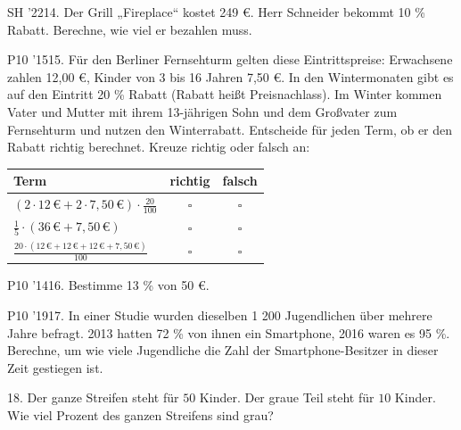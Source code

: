 \documentclass[11pt]{article}
\begin{document}
\pfgruppe{}
\begin{pfaufg}{SH ’22}{14.}{}
Der Grill „Fireplace“ kostet 249 €. Herr Schneider bekommt 10 \% Rabatt. Berechne, wie viel er bezahlen muss.
\end{pfaufg}
\pfgruppe{}
\begin{pfaufg}{P10 ’15}{15.}{}
Für den Berliner Fernsehturm gelten diese Eintrittspreise: Erwachsene zahlen 12,00 €, Kinder von 3 bis 16 Jahren 7,50 €. In den Wintermonaten gibt es auf den Eintritt 20 \% Rabatt (Rabatt heißt Preisnachlass). Im Winter kommen Vater und Mutter mit ihrem 13-jährigen Sohn und dem Großvater zum Fernsehturm und nutzen den Winterrabatt. Entscheide für jeden Term, ob er den Rabatt richtig berechnet. Kreuze richtig oder falsch an:
\par\smallskip\noindent \begingroup\renewcommand{\arraystretch}{1.5}\begin{tabular}{|l|c|c|}\hline Term & richtig & falsch\\ \hline $(2\cdot 12\,€ + 2\cdot 7{,}50\,€)\cdot\tfrac{20}{100}$ & $\square$ & $\square$ \\ $\tfrac{1}{5}\cdot(36\,€ + 7{,}50\,€)$ & $\square$ & $\square$ \\ $\tfrac{20\cdot(12\,€ + 12\,€ + 12\,€ + 7{,}50\,€)}{100}$ & $\square$ & $\square$ \\ \hline\end{tabular}\endgroup\par
{}
\end{pfaufg}
\pfgruppe{}
\begin{pfaufg}{P10 ’14}{16.}{}
Bestimme 13 \% von 50 €.
\end{pfaufg}
\pfgruppe{}
\begin{pfaufg}{P10 ’19}{17.}{}
In einer Studie wurden dieselben 1 200 Jugendlichen über mehrere Jahre befragt. 2013 hatten 72 \% von ihnen ein Smartphone, 2016 waren es 95 \%. Berechne, um wie viele Jugendliche die Zahl der Smartphone-Besitzer in dieser Zeit gestiegen ist.
\end{pfaufg}
\pfgruppe{}
\begin{pfaufg}{}{18.}{}
Der ganze Streifen steht für $50$ Kinder. Der graue Teil steht für $10$ Kinder. Wie viel Prozent des ganzen Streifens sind grau?
\par\smallskip\noindent {}\par
{}
\end{pfaufg}
\end{document}
